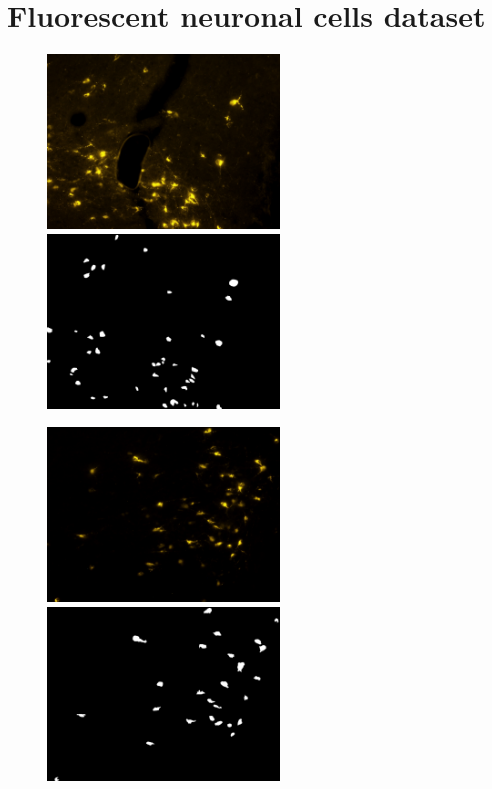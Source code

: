 \chapter{Fluorescent neuronal cells dataset}
\label{chap:partI_dataset}

\begin{figure}
\centerline{
\includegraphics[width=0.55\textwidth]{figures/120_dataset/i_big_hole.jpeg}
\includegraphics[width=0.55\textwidth]{figures/120_dataset/m_big_hole.png}
}
\centerline{
\includegraphics[width=0.55\textwidth]{figures/120_dataset/i_168.jpeg}
\includegraphics[width=0.55\textwidth]{figures/120_dataset/m_168.jpeg}
}
\end{figure}

